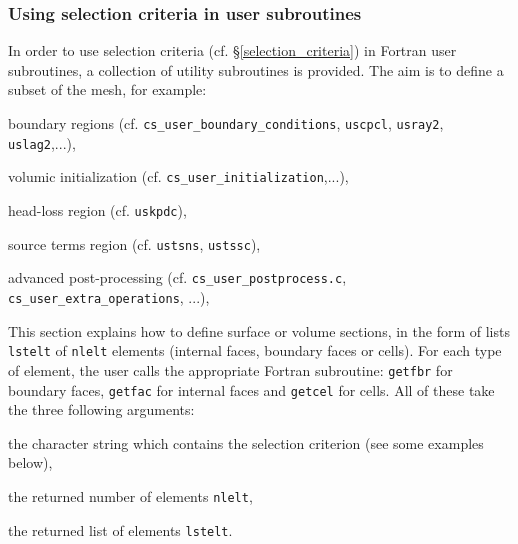 {{{%
\subsubsection{Using selection criteria in user subroutines}
\label{fvm_selector}

In order to use selection criteria (cf. \S\ref{selection_criteria}) in Fortran
user subroutines, a collection of utility subroutines is provided. The aim is to
define a subset of the mesh, for example:

\begin{list}{-}{}
\item boundary regions (cf. \texttt{cs\_user\_boundary\_conditions}, \texttt{uscpcl},
\texttt{usray2}, \texttt{uslag2},...),
\item volumic initialization (cf. \texttt{cs\_user\_initialization},...),
\item head-loss region (cf. \texttt{uskpdc}),
\item source terms region (cf. \texttt{ustsns}, \texttt{ustssc}),
\item advanced post-processing (cf. \texttt{cs\_user\_postprocess.c},
      \texttt{cs\_user\_extra\_operations}, ...),
\end{list}

This section explains how to define surface or volume sections,
in the form of lists \texttt{lstelt} of \texttt{nlelt} elements
(internal faces, boundary faces or cells).
For each type of element, the user calls the appropriate Fortran
subroutine: \texttt{getfbr}
for boundary faces, \texttt{getfac} for internal faces
and \texttt{getcel} for cells. All of these take
the three following arguments:
\begin{list}{-}{}
\item the character string which contains the selection
      criterion (see some examples below), 
\item the returned number of elements \texttt{nlelt}, 
\item the returned list of elements \texttt{lstelt}. 
\end{list}

}}}
